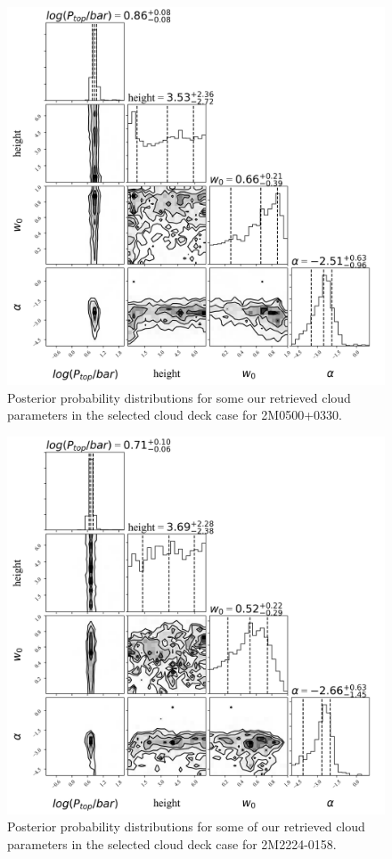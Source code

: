 \documentclass[useAMS,usenatbib]{mn2e}
\begin{document}
\begin{figure}
\hspace{-0.8cm}
\includegraphics[width=350pt]{2M0500_THICK_POW_cloudbits_ucl.png}
\caption{Posterior probability distributions for some our retrieved cloud parameters in the selected cloud deck case for 2M0500+0330.
\label{fig:2m0500cloud}}
\end{figure}


\begin{figure}
\hspace{-0.8cm}
\includegraphics[width=350pt]{2M2224_THICK_POW_cloudbits_ucl.png}
\caption{Posterior probability distributions for some of our retrieved cloud parameters in the selected cloud deck case for 2M2224-0158. 
\label{fig:2m2224cloud}}
\end{figure}
\end{document}
